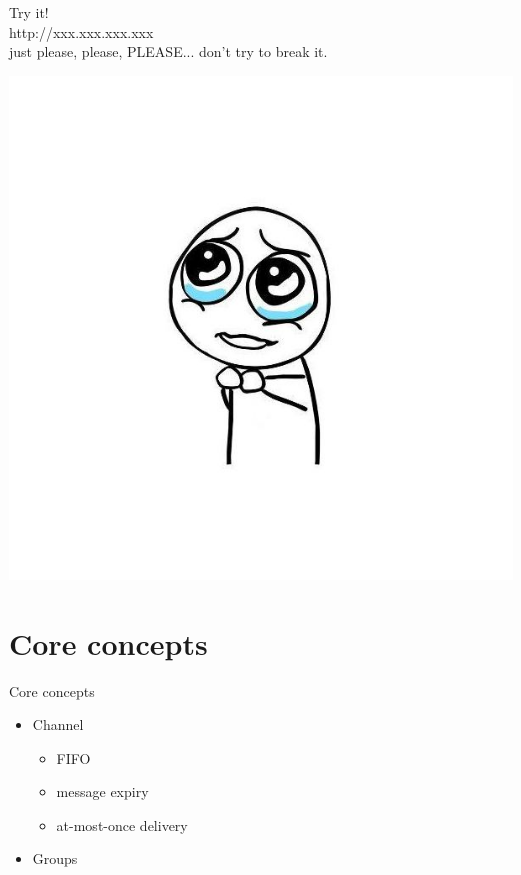 \documentclass{beamer}
\begin{document}
\begin{frame}
	\begin{center}
	Try it!\\
	\huge
	http://xxx.xxx.xxx.xxx\\
	\normalsize
	\vspace{1em}
	\scriptsize
	just please, please, PLEASE... don't try to break it.\\
	\end{center}
	
	\begin{flushright}
			\includegraphics[scale=0.15]{please.jpg}	
	\end{flushright}
\end{frame}

\section{Core concepts}

\begin{frame}{Core concepts}
	\begin{adjustwidth}{2em}{2.5em}
	\begin{itemize}
		\item Channel
			\begin{itemize}
				\item FIFO
				\item message expiry
				\item at-most-once delivery
			\end{itemize}
		\item Groups
	\end{itemize}
	\end{adjustwidth}
\end{frame}
\end{document}
